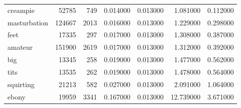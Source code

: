 \begin{tabular}{lrrrrrr}
creampie & 52785 & 749 & 0.014000 & 0.013000 & 1.081000 & 0.112000 \\
masturbation & 124667 & 2013 & 0.016000 & 0.013000 & 1.229000 & 0.298000 \\
feet & 17335 & 297 & 0.017000 & 0.013000 & 1.308000 & 0.387000 \\
amateur & 151900 & 2619 & 0.017000 & 0.013000 & 1.312000 & 0.392000 \\
big & 13345 & 258 & 0.019000 & 0.013000 & 1.477000 & 0.562000 \\
tits & 13535 & 262 & 0.019000 & 0.013000 & 1.478000 & 0.564000 \\
squirting & 21213 & 582 & 0.027000 & 0.013000 & 2.091000 & 1.064000 \\
ebony & 19959 & 3341 & 0.167000 & 0.013000 & 12.739000 & 3.671000 \\
\bottomrule
\end{tabular}
